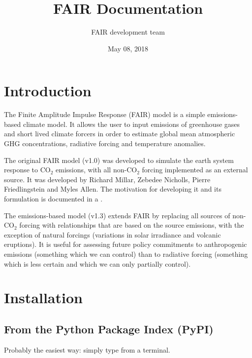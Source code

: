 \documentclass[letterpaper,10pt,english]{sphinxmanual}
\title{FAIR Documentation}
\date{May 08, 2018}
\author{FAIR development team}
\begin{document}
\maketitle
\sphinxtableofcontents
{}\label{\detokenize{index::doc}}



\chapter{Introduction}
\label{\detokenize{intro:introduction}}\label{\detokenize{intro:fair-finite-amplitude-impulse-response-simple-climate-model}}\label{\detokenize{intro::doc}}
The Finite Amplitude Impulse Response (FAIR) model is a simple
emissions-based climate model. It allows the user to input emissions of
greenhouse gases and short lived climate forcers in order to estimate
global mean atmospheric GHG concentrations, radiative forcing and
temperature anomalies.

The original FAIR model (v1.0) was developed to simulate the earth
system response to CO$_{\text{2}}$ emissions, with all non-CO$_{\text{2}}$ forcing implemented as an \sphinxquotedblleft{}external\sphinxquotedblright{} source. It was developed by Richard
Millar, Zebedee Nicholls, Pierre Friedlingstein and Myles Allen. The
motivation for developing it and its formulation is documented in a
.

The emissions-based model (v1.3) extends FAIR by replacing all sources of
non-CO$_{\text{2}}$ forcing with relationships that are based on the
source emissions, with the exception of natural forcings (variations
in solar irradiance and volcanic eruptions). It is useful for
assessing future policy commitments to anthropogenic emissions
(something which we can control) than to radiative forcing (something
which is less certain and which we can only partially control).


\chapter{Installation}
\label{\detokenize{installation:installation}}\label{\detokenize{installation::doc}}

\section{From the Python Package Index (PyPI)}
\label{\detokenize{installation:from-the-python-package-index-pypi}}
Probably the easiest way: simply type  from a terminal.
\end{document}
